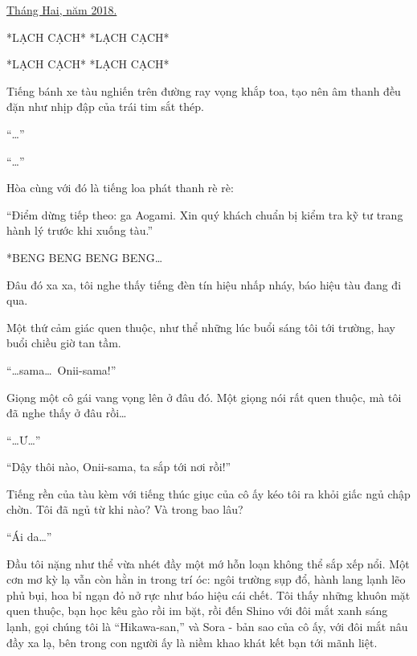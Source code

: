 \documentclass[../main.tex]{subfiles}
\begin{document}

\begin{center}
    \uline{Tháng Hai, năm 2018.}
\end{center}

*LẠCH CẠCH* *LẠCH CẠCH*

*LẠCH CẠCH* *LẠCH CẠCH*

Tiếng bánh xe tàu nghiến trên đường ray vọng khắp toa, tạo nên âm thanh đều đặn như nhịp đập của trái tim sắt thép.

``\dots''

``\dots''

Hòa cùng với đó là tiếng loa phát thanh rè rè:

``Điểm dừng tiếp theo: ga Aogami. Xin quý khách chuẩn bị kiểm tra kỹ tư trang hành lý trước khi xuống tàu.''

*BENG BENG BENG BENG\dots*

Đâu đó xa xa, tôi nghe thấy tiếng đèn tín hiệu nhấp nháy, báo hiệu tàu đang đi qua.

Một thứ cảm giác quen thuộc, như thể những lúc buổi sáng tôi tới trường, hay buổi chiều giờ tan tầm.

``\dots sama\dots\ Onii-sama!''

Giọng một cô gái vang vọng lên ở đâu đó. Một giọng nói rất quen thuộc, mà tôi đã nghe thấy ở đâu rồi\dots

``\dots Ư\dots''

``Dậy thôi nào, Onii-sama, ta sắp tới nơi rồi!''

Tiếng rền của tàu kèm với tiếng thúc giục của cô ấy kéo tôi ra khỏi giấc ngủ chập chờn. Tôi đã ngủ từ khi nào? Và trong bao lâu?

``Ái da\dots''

Đầu tôi nặng như thể vừa nhét đầy một mớ hỗn loạn không thể sắp xếp nổi. Một cơn mơ kỳ lạ vẫn còn hằn in trong trí óc: ngôi trường sụp đổ, hành lang lạnh lẽo phủ bụi, hoa bỉ ngạn đỏ nở rực như báo hiệu cái chết. Tôi thấy những khuôn mặt quen thuộc, bạn học kêu gào rồi im bặt, rồi đến Shino với đôi mắt xanh sáng lạnh, gọi chúng tôi là ``Hikawa-san,'' và Sora - bản sao của cô ấy, với đôi mắt nâu đầy xa lạ, bên trong con người ấy là niềm khao khát kết bạn tới mãnh liệt.
\end{document}
